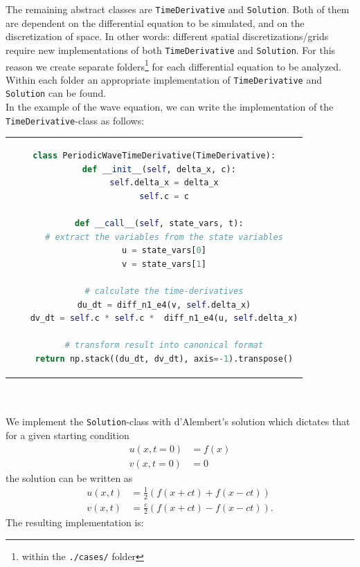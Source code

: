 The remaining abstract classes are \texttt{TimeDerivative} and \texttt{Solution}.
Both of them are dependent on the differential equation to be simulated, and on the discretization of space.
In other words: different spatial discretizations/grids require new implementations of both \texttt{TimeDerivative} and \texttt{Solution}.
For this reason we create separate folders\footnote{within the \texttt{./cases/} folder} for each differential equation to be analyzed.
Within each folder an appropriate implementation of \texttt{TimeDerivative} and \texttt{Solution} can be found.
\\

\noindent
In the example of the wave equation, we can write the implementation of the \texttt{TimeDerivative}-class as follows:\\
\begin{tabular}{c}
\begin{lstlisting}[language=Python]
class PeriodicWaveTimeDerivative(TimeDerivative):
  def __init__(self, delta_x, c):
    self.delta_x = delta_x
    self.c = c

  def __call__(self, state_vars, t):
    # extract the variables from the state variables
    u = state_vars[0]
    v = state_vars[1]
			
    # calculate the time-derivatives
    du_dt = diff_n1_e4(v, self.delta_x)
    dv_dt = self.c * self.c *  diff_n1_e4(u, self.delta_x)
        	
    # transform result into canonical format
    return np.stack((du_dt, dv_dt), axis=-1).transpose()
\end{lstlisting}
\end{tabular}
\\\\
We implement the \texttt{Solution}-class with d'Alembert's solution which dictates that for a given starting condition
\begin{align*}
u(x,t=0) &= f(x)\\
v(x,t=0) &= 0
\end{align*}
the solution can be written as
\begin{align*}
u(x,t) &= \frac{1}{2}(f(x+ct)+f(x-ct))\\
v(x,t) &= \frac{c}{2}(f(x+ct)-f(x-ct)).
\end{align*}
The resulting implementation is:\\
